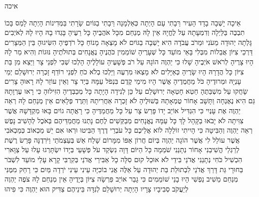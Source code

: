 \documentclass[../main/main.tex]{subfiles}
\begin{document}
\Incipit{}איכה\par
\vspace{\afterchapskip}
\RTLmulticolcolumns
\begin{multicols}{\ncols}
אֵיכָה יָשְׁבָה בָדָד הָעִיר רַּבָתִי עָם הָיְתָה כְּאַלְמָנָה רַּבָתִי בַגּוֹיִם שָׂרָתִי בַּמְּדִינוֹת הָיְתָה לָמַס \ClosedSection{}בָּכוֹ תִבְכֶּה בַּלַּיְלָה וְדִמְעָתָהּ עַל לֶחֱיָהּ אֵין לָהּ מְנַחֵם מִכָּל אֹהֲבֶיהָ כָּל רֵעֶיהָ בָּגְדוּ בָהּ הָיוּ לָהּ לְאֹיְבִים \ClosedSection{}גָּלְתָה יְהוּדָה מֵעֹנִי וּמֵרֹב עֲבֹדָה הִיא יָשְׁבָה בַגּוֹיִם לֹא מָצְאָה מָנוֹחַ כָּל רֹדְפֶיהָ הִשִּׂיגוּהָ בֵּין הַמְּצָרִים \ClosedSection{}דַּרְכֵי צִיּוֹן אֲבֵלוֹת מִבְּלִי בָּאֵי מוֹעֵד כָּל שְׁעָרֶיהָ שׁוֹמֵמִין כֹּהֲנֶיהָ נֶאֱנָחִים בְּתוּלֹתֶיהָ נּוּגוֹת וְהִיא מַר לָהּ \ClosedSection{}הָיוּ צָרֶיהָ לְרֹאשׁ אֹיְבֶיהָ שָׁלוּ כִּי יַהְוֶה הוֹגָהּ עַל רֹב פְּשָׁעֶיהָ עוֹלָלֶיהָ הָלְכוּ שְׁבִי לִפְנֵי צָר \ClosedSection{}וַיֵּצֵא מִן בַּת צִיּוֹן כָּל הֲדָרָהּ הָיוּ שָׂרֶיהָ כְּאַיָּלִים לֹא מָצְאוּ מִרְעֶה וַיֵּלְכוּ בְלֹא כֹחַ לִפְנֵי רוֹדֵף \ClosedSection{}זָכְרָה יְרוּשָׁלֵם יְמֵי עָנְיָהּ וּמְרוּדֶיהָ כֹּל מַחֲמֻדֶיהָ אֲשֶׁר הָיוּ מִימֵי קֶדֶם בִּנְפֹל עַמָּהּ בְּיַד צָר וְאֵין עוֹזֵר לָהּ רָאוּהָ צָרִים שָׂחֲקוּ עַל מִשְׁבַּתֶּהָ \ClosedSection{}חֵטְא חָטְאָה יְרוּשָׁלֵם עַל כֵּן לְנִידָה הָיָתָה כָּל מְכַבְּדֶיהָ הִזִּילוּהָ כִּי רָאוּ עֶרְוָתָהּ גַּם הִיא נֶאֶנְחָה וַתָּשָׁב אָחוֹר \ClosedSection{}טֻמְאָתָהּ בְּשׁוּלֶיהָ לֹא זָכְרָה אַחֲרִיתָהּ וַתֵּרֶד פְּלָאִים אֵין מְנַחֵם לָהּ רְאֵה יַהְוֶה אֶת עָנְיִי כִּי הִגְדִּיל אוֹיֵב \ClosedSection{}יָדוֹ פָּרַשׂ צָר עַל כָּל מַחֲמַדֶּיהָ כִּי רָאֲתָה גוֹיִם בָּאוּ מִקְדָּשָׁהּ אֲשֶׁר צִוִּיתָה לֹא יָבֹאוּ בַקָּהָל לָךְ \ClosedSection{}כָּל עַמָּהּ נֶאֱנָחִים מְבַקְּשִׁים לֶחֶם נָתְנוּ מַחֲמַדֵּיהֶם\SubEnd{} בְּאֹכֶל לְהָשִׁיב נָפֶשׁ רְאֵה יַהְוֶה וְהַבִּיטָה כִּי הָיִיתִי זוֹלֵלָה \ClosedSection{}לוֹא אֲלֵיכֶם כָּל עֹבְרֵי דֶרֶךְ הַבִּיטוּ וּרְאוּ אִם יֵשׁ מַכְאוֹב כְּמַכְאֹבִי אֲשֶׁר עוֹלַל לִי אֲשֶׁר הוֹגָה יַהְוֶה בְּיוֹם חֲרוֹן אַפּוֹ \ClosedSection{}מִמָּרוֹם שָׁלַח אֵשׁ בְּעַצְמֹתַי וַיֹּרִדֶנָּה\SubEnd{} פָּרַשׂ רֶשֶׁת לְרַגְלַי הֱשִׁיבַנִי אָחוֹר נְתָנַנִי שֹׁמֵמָה כָּל הַיּוֹם דָּוָה \ClosedSection{}נִשְׂקַד עֹל פְּשָׁעַי בְּיָדוֹ יִשְׂתָּרְגוּ עָלוּ עַל צַוָּארִי הִכְשִׁיל כֹּחִי נְתָנַנִי אֲדֹנַי בִּידֵי לֹא אוּכַל קוּם \ClosedSection{}סִלָּה כָל אַבִּירַי אֲדֹנַי בְּקִרְבִּי קָרָא עָלַי מוֹעֵד לִשְׁבֹּר בַּחוּרָי גַּת דָּרַךְ אֲדֹנַי לִבְתוּלַת בַּת יְהוּדָה \ClosedSection{}עַל אֵלֶּה אֲנִי בוֹכִיָּה עֵינִי עֵינִי יֹרְדָה מַּיִם כִּי רָחַק מִמֶּנִּי מְנַחֵם מֵשִׁיב נַפְשִׁי הָיוּ בָנַי שׁוֹמֵמִים כִּי גָבַר אוֹיֵב \ClosedSection{}פֵּרְשָׂה צִיּוֹן בְּיָדֶיהָ אֵין מְנַחֵם לָהּ צֹפֶה\SubEnd{} יַהְוֶה לְיַעֲקֹב סְבִיבָיו צָרָיו הָיְתָה יְרוּשָׁלֵם לְנִדָּה בֵּינֵיהֶם \ClosedSection{}צַדִּיק הוּא יַהְוֶה כִּי פִיהוּ 
\end{multicols}
\end{document}

